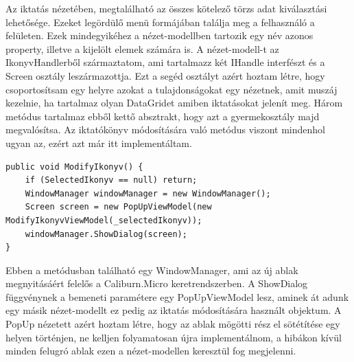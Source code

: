 \documentclass[
]{thesis-ekf}
\theoremstyle{definition}
\theoremstyle{remark}
\begin{document}
Az iktatás nézetében, megtalálható az összes kötelező törzs adat kiválasztási lehetősége. Ezeket legördülő menü formájában találja meg a felhasználó a felületen. Ezek mindegyikéhez a nézet-modellben tartozik egy név azonos property, illetve a kijelölt elemek számára is. A nézet-modell-t az IkonyvHandlerből származtatom, ami tartalmazz két IHandle interfészt és a Screen osztály leszármazottja. Ezt a segéd osztályt azért hoztam létre, hogy csoportosítsam egy helyre azokat a tulajdonságokat egy nézetnek, amit muszáj kezelnie, ha tartalmaz olyan DataGridet amiben iktatásokat jelenít meg. Három metódus tartalmaz ebből kettő absztrakt, hogy azt a gyermekosztály majd megvalósítsa. Az iktatókönyv módosítására való metódus viszont mindenhol ugyan az, ezért azt már itt implementáltam. 
\begin{lstlisting}[caption={Iktatás módosítása ablak megnyítása WindowManager segítségével.},captionpos=b]
public void ModifyIkonyv() {
	if (SelectedIkonyv == null) return;
	WindowManager windowManager = new WindowManager();
	Screen screen = new PopUpViewModel(new ModifyIkonyvViewModel(_selectedIkonyv));
	windowManager.ShowDialog(screen);	
}
\end{lstlisting}
Ebben a metódusban található egy WindowManager, ami az új ablak megnyitásáért felelős a Caliburn.Micro keretrendszerben. A ShowDialog függvénynek a bemeneti paramétere egy PopUpViewModel lesz, aminek át adunk egy másik nézet-modellt ez pedig az iktatás módosítására használt objektum. A PopUp nézetett azért hoztam létre, hogy az ablak mögötti rész el sötétítése egy helyen történjen, ne kelljen folyamatosan újra implementálnom, a hibákon kívül minden felugró ablak ezen a nézet-modellen keresztül fog megjelenni. 
\end{document}
